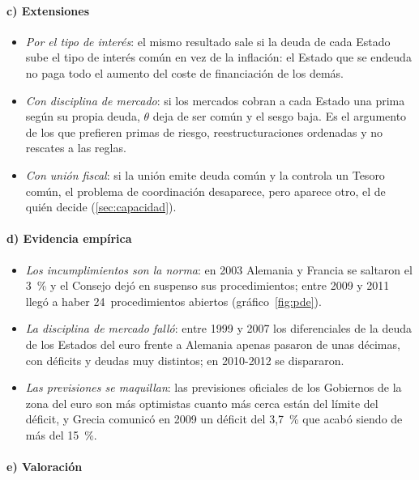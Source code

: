 \documentclass[11pt]{article}
\begin{document}
\paragraph{c) Extensiones}

\begin{itemize}
\item \emph{Por el tipo de interés}: el mismo resultado sale si la deuda de cada Estado sube el tipo de interés común en vez de la inflación: el Estado que se endeuda no paga todo el aumento del coste de financiación de los demás.
\item \emph{Con disciplina de mercado}: si los mercados cobran a cada Estado una prima según su propia deuda, $\theta$ deja de ser común y el sesgo baja. Es el argumento de los que prefieren primas de riesgo, reestructuraciones ordenadas y no rescates a las reglas\nocite{BenassyQuere2018Reconciling}.
\item \emph{Con unión fiscal}: si la unión emite deuda común y la controla un Tesoro común, el problema de coordinación desaparece, pero aparece otro, el de quién decide (\ref{sec:capacidad}).
\end{itemize}

\paragraph{d) Evidencia empírica}

\begin{itemize}
\item \emph{Los incumplimientos son la norma}: en 2003 Alemania y Francia se saltaron el 3~\% y el Consejo dejó en suspenso sus procedimientos; entre 2009 y 2011 llegó a haber 24~procedimientos abiertos (gráfico~\ref{fig:pde}).
\item \emph{La disciplina de mercado falló}: entre 1999 y 2007 los diferenciales de la deuda de los Estados del euro frente a Alemania apenas pasaron de unas décimas, con déficits y deudas muy distintos; en 2010-2012 se dispararon.
\item \emph{Las previsiones se maquillan}: las previsiones oficiales de los Gobiernos de la zona del euro son más optimistas cuanto más cerca están del límite del déficit\nocite{FrankelSchreger2013}, y Grecia comunicó en 2009 un déficit del 3,7~\% que acabó siendo de más del 15~\%\nocite{Eurostat2010Grecia}.
\end{itemize}

\paragraph{e) Valoración}
\end{document}
